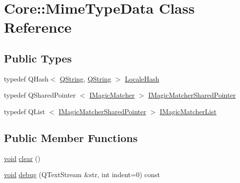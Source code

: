\hypertarget{class_core_1_1_mime_type_data}{\section{\-Core\-:\-:\-Mime\-Type\-Data \-Class \-Reference}
\label{class_core_1_1_mime_type_data}
}
\subsection*{\-Public \-Types}
\begin{DoxyCompactItemize}
\item 
typedef \-Q\-Hash$<$ \hyperlink{group___u_a_v_objects_plugin_gab9d252f49c333c94a72f97ce3105a32d}{\-Q\-String}, \hyperlink{group___u_a_v_objects_plugin_gab9d252f49c333c94a72f97ce3105a32d}{\-Q\-String} $>$ \hyperlink{group___core_plugin_gabaf932c31842b2da7fc0e9821b5411dd}{\-Locale\-Hash}
\item 
typedef \-Q\-Shared\-Pointer\*
$<$ \hyperlink{class_core_1_1_i_magic_matcher}{\-I\-Magic\-Matcher} $>$ \hyperlink{group___core_plugin_ga8fa7db2543f765d51cec31286aedb04c}{\-I\-Magic\-Matcher\-Shared\-Pointer}
\item 
typedef \-Q\-List\*
$<$ \hyperlink{group___core_plugin_ga8fa7db2543f765d51cec31286aedb04c}{\-I\-Magic\-Matcher\-Shared\-Pointer} $>$ \hyperlink{group___core_plugin_ga01712cfcc6b7a1dd9c6a1163064fc3d6}{\-I\-Magic\-Matcher\-List}
\end{DoxyCompactItemize}
\subsection*{\-Public \-Member \-Functions}
\begin{DoxyCompactItemize}
\item 
\hyperlink{group___u_a_v_objects_plugin_ga444cf2ff3f0ecbe028adce838d373f5c}{void} \hyperlink{group___core_plugin_ga696ca77d0eee7564afa621295c65a8d4}{clear} ()
\item 
\hyperlink{group___u_a_v_objects_plugin_ga444cf2ff3f0ecbe028adce838d373f5c}{void} \hyperlink{group___core_plugin_gaa64a9e20765f2b6ebd9fff06054fc469}{debug} (\-Q\-Text\-Stream \&str, int indent=0) const 
\end{DoxyCompactItemize}
